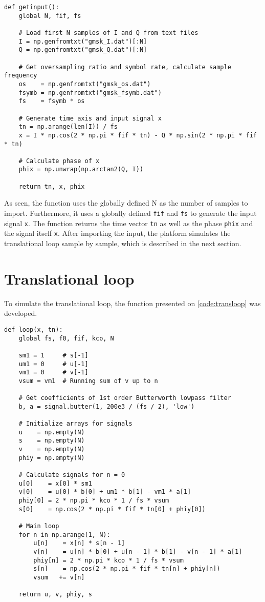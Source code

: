 \lstset{language=python,caption=Function for importing input data,label=code:input}
\begin{lstlisting}
def getinput():
    global N, fif, fs

    # Load first N samples of I and Q from text files
    I = np.genfromtxt("gmsk_I.dat")[:N]
    Q = np.genfromtxt("gmsk_Q.dat")[:N]

    # Get oversampling ratio and symbol rate, calculate sample frequency
    os    = np.genfromtxt("gmsk_os.dat")
    fsymb = np.genfromtxt("gmsk_fsymb.dat")
    fs    = fsymb * os

    # Generate time axis and input signal x
    tn = np.arange(len(I)) / fs
    x = I * np.cos(2 * np.pi * fif * tn) - Q * np.sin(2 * np.pi * fif * tn)

    # Calculate phase of x
    phix = np.unwrap(np.arctan2(Q, I))

    return tn, x, phix
\end{lstlisting}
As seen, the function uses the globally defined N as the number of samples to import. Furthermore, it uses a globally defined \texttt{fif} and \texttt{fs} to generate the input signal \texttt{x}. The function returns the time vector \texttt{tn} as well as the phase \texttt{phix} and the signal itself \texttt{x}. After importing the input, the platform simulates the translational loop sample by sample, which is described in the next section.


\section{Translational loop}
To simulate the translational loop, the function presented on \cref{code:transloop} was developed.\\

\lstset{language=python,caption=Function for simulating tranlational loop,label=code:transloop}
\begin{lstlisting}
def loop(x, tn):
    global fs, f0, fif, kco, N

    sm1 = 1     # s[-1]
    um1 = 0     # u[-1]
    vm1 = 0     # v[-1]
    vsum = vm1  # Running sum of v up to n

    # Get coefficients of 1st order Butterworth lowpass filter
    b, a = signal.butter(1, 200e3 / (fs / 2), 'low')

    # Initialize arrays for signals
    u    = np.empty(N)
    s    = np.empty(N)
    v    = np.empty(N)
    phiy = np.empty(N)

    # Calculate signals for n = 0
    u[0]    = x[0] * sm1
    v[0]    = u[0] * b[0] + um1 * b[1] - vm1 * a[1]
    phiy[0] = 2 * np.pi * kco * 1 / fs * vsum
    s[0]    = np.cos(2 * np.pi * fif * tn[0] + phiy[0])

    # Main loop
    for n in np.arange(1, N):
        u[n]    = x[n] * s[n - 1]
        v[n]    = u[n] * b[0] + u[n - 1] * b[1] - v[n - 1] * a[1]
        phiy[n] = 2 * np.pi * kco * 1 / fs * vsum
        s[n]    = np.cos(2 * np.pi * fif * tn[n] + phiy[n])
        vsum   += v[n]

    return u, v, phiy, s
\end{lstlisting}


